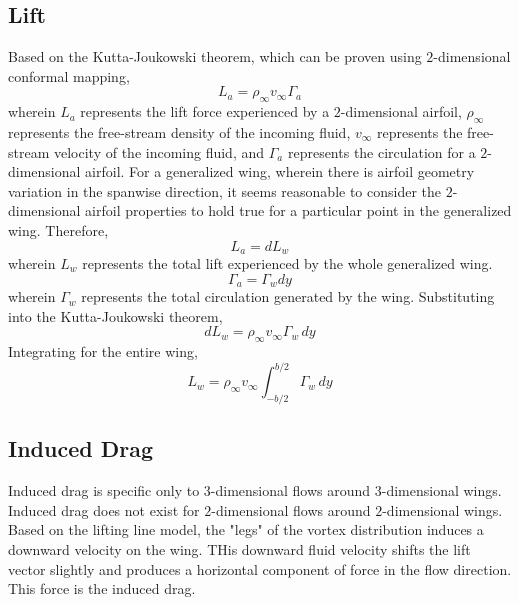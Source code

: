 \documentclass[a4paper, 12pt]{report}
\begin{document}
\begin{center}
\subsection{Lift}
\begin{comment}
\end{comment}
Based on the Kutta-Joukowski theorem, which can be proven using $2$-dimensional conformal mapping,
$$L_{a} = \rho_{\infty}v_{\infty}\Gamma_{a}$$
wherein $L_{a}$ represents the lift force experienced by a $2$-dimensional airfoil, $\rho_{\infty}$ represents the free-stream density of the incoming fluid, $v_{\infty}$ represents the free-stream velocity of the incoming fluid, and $\Gamma_{a}$ represents the circulation for a $2$-dimensional airfoil. For a generalized wing, wherein there is airfoil geometry variation in the spanwise direction, it seems reasonable to consider the $2$-dimensional airfoil properties to hold true for a particular point in the generalized wing. Therefore, 
$$L_{a} = dL_{w}$$
wherein $L_{w}$ represents the total lift experienced by the whole generalized wing.
$$\Gamma_{a} = \Gamma_{w}dy$$
wherein $\Gamma_{w}$ represents the total circulation generated by the wing. Substituting into the Kutta-Joukowski theorem,
\begin{equation}
dL_{w} = \rho_{\infty}v_{\infty}\Gamma_{w}\,dy
\label{differential lift in lifting line}
\end{equation}
Integrating for the entire wing,
\begin{equation}
L_{w} = \rho_{\infty}v_{\infty}\int^{b/2}_{-b/2}\Gamma_{w}\,dy
\label{Lift in Lifting Line Theory}
\end{equation}


\subsection{Induced Drag}
\begin{comment}
\end{comment}
Induced drag is specific only to $3$-dimensional flows around $3$-dimensional wings. Induced drag does not exist for $2$-dimensional flows around $2$-dimensional wings. Based on the lifting line model, the "legs" of the vortex distribution induces a downward velocity on the wing. THis downward fluid velocity shifts the lift vector slightly and produces a horizontal component of force in the flow direction. This force is the induced drag.


\end{center}
\end{document}

